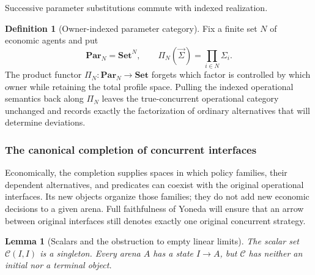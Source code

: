 \documentclass[11pt,a4paper]{article}
\numberwithin{equation}{section}
\newtheorem{lemma}[theorem]{Lemma}
\theoremstyle{definition}
\newtheorem{definition}[theorem]{Definition}
\theoremstyle{remark}
\theoremstyle{plain}
\begin{document}
\noindent Successive parameter substitutions commute with indexed realization.
\begin{center}
\end{center}

\begin{definition}[Owner-indexed parameter category]
\label{def:egt-owner-indexed-parameter-category}
Fix a finite set $N$ of economic agents and put
\[
 \mathbf{Par}_N=\mathbf{Set}^N,
 \qquad
 \Pi_N(\vec\Sigma)=\prod_{i\in N}\Sigma_i.
\]
The product functor $\Pi_N:\mathbf{Par}_N\to\mathbf{Set}$ forgets which
factor is controlled by which owner while retaining the total profile space.
Pulling the indexed operational semantics back along $\Pi_N$ leaves the
true-concurrent operational category unchanged and records exactly the
factorization of ordinary alternatives that will determine deviations.
\end{definition}

\subsubsection{The canonical completion of concurrent interfaces}

Economically, the completion supplies spaces in which policy families,
their dependent alternatives, and predicates can coexist with the original
operational interfaces. Its new objects organize those families; they do
not add new economic decisions to a given arena. Full faithfulness of Yoneda
will ensure that an arrow between original interfaces still denotes exactly
one original concurrent strategy.

\begin{lemma}[Scalars and the obstruction to empty linear limits]
\label{lem:egt-native-empty-obstruction}
The scalar set $\mathcal C(I,I)$ is a singleton. Every arena $A$ has a
state $I\to A$, but $\mathcal C$ has neither an initial nor a terminal
object.
\end{lemma}
\end{document}
